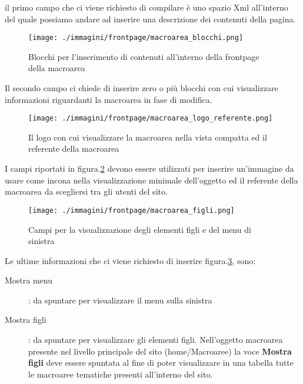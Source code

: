 il primo campo che ci viene richiesto di compilare è uno spazio Xml all'interno del quale possiamo andare ad inserire una descrizione dei contenuti della pagina.
\begin{figure}[H]
 \centering
 \texttt{[image: ./immagini/frontpage/macroarea\_blocchi.png]}
 \caption{Blocchi per l'inserimento di contenuti all'interno della frontpage della macroarea}
 \label{fig:macroaree_blocchi}
\end{figure}

Il secondo campo ci chiede di inserire  zero o più blocchi con cui visualizzare informazioni riguardanti la macroarea in fase di modifica.


\begin{figure}[H]
 \centering
 \texttt{[image: ./immagini/frontpage/macroarea\_logo\_referente.png]}
 \caption{Il logo con cui visualizzare la macroarea nella vista compatta ed il referente della macroarea}
 \label{fig:macroaree_logo}
\end{figure}

I campi riportati in figura.\ref{fig:macroaree_logo} devono essere utilizzati per inserire un'immagine da usare come incona nella visualizzazione minimale dell'oggetto ed il referente della macroarea da scegliersi tra gli utenti del sito.
\begin{figure}[H]
 \centering
 \texttt{[image: ./immagini/frontpage/macroarea\_figli.png]}
 \caption{Campi per la visualizzazione degli elementi figli e del menu di sinistra}
 \label{fig:macroaree_figli}
\end{figure}

Le ultime informazioni che ci viene richiesto di inserire figura.\ref{fig:macroaree_figli}, sono:
\begin{description}
 \item[Mostra menu]: da spuntare per visualizzare il menu sulla sinistra 
\item[Mostra figli]: da spuntare per visualizzare gli elementi figli. Nell'oggetto macroarea presente nel livello principale del sito (home/Macroaree) la voce \textbf{Mostra figli} deve essere spuntata al fine di poter visualizzare in una tabella tutte le macroaree tematiche presenti all'interno del sito.
\end{description}

